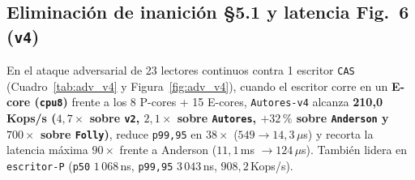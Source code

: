 \documentclass[10pt,twocolumn,a4paper]{article}
\begin{document}
\subsection{Eliminación de inanición \S 5.1 y latencia Fig.~6 (\texttt{v4})}
En el ataque adversarial de 23 lectores continuos contra 1 escritor \texttt{CAS} (Cuadro~\ref{tab:adv_v4} y Figura~\ref{fig:adv_v4}), cuando el escritor corre en un \textbf{E-core (\texttt{cpu8})} frente a los 8 P-cores + 15 E-cores, \texttt{Autores-v4} alcanza \textbf{210{,}0\,Kops/s ($4{,}7\times$ sobre \texttt{v2}, $2{,}1\times$ sobre \texttt{Autores}, $+32\,\%$ sobre \texttt{Anderson} y $700\times$ sobre \texttt{Folly})}, reduce \texttt{p99,95} en \textbf{$38\times$} ($549 \to 14{,}3\,\mu$s) y recorta la latencia máxima \textbf{$90\times$} frente a Anderson ($11{,}1\,$ms $\to 124\,\mu$s). También lidera en \texttt{escritor-P} (\texttt{p50} $1\,068$\,ns, \texttt{p99,95} $3\,043$\,ns, $908{,}2$\,Kops/s).

\begin{table}[H]
\centering
\caption{Ataque adversarial \S 5.1 (23 lectores vs.\ 1 escritor \texttt{CAS}, mediana 5 rondas $\times$ 2\,s).}
\label{tab:adv_v4}
\footnotesize
{}
\end{table}
\end{document}
